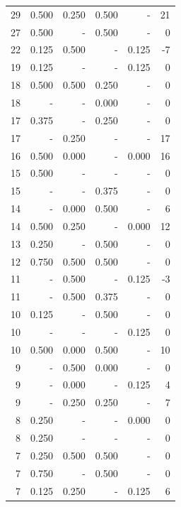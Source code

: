 \documentclass[a4paper]{article}\usepackage[]{graphicx}\usepackage[]{color}
\begin{document}
\begin{table}[ht]
\begin{tabular}{rrrrrr}
   \rowcolor{badColor} 29 & 0.500 & 0.250 & 0.500 & - & 21 \\ 
   \rowcolor{sosoColor} 27 & 0.500 & - & 0.500 & - & 0 \\ 
  22 & 0.125 & 0.500 & - & 0.125 & -7 \\ 
   \rowcolor{nullColor} 19 & 0.125 & - & - & 0.125 & 0 \\ 
   \rowcolor{badColor} 18 & 0.500 & 0.500 & 0.250 & - & 0 \\ 
   \rowcolor{sosoColor} 18 & - & - & 0.000 & - & 0 \\ 
   \rowcolor{sosoColor} 17 & 0.375 & - & 0.250 & - & 0 \\ 
  17 & - & 0.250 & - & - & 17 \\ 
  16 & 0.500 & 0.000 & - & 0.000 & 16 \\ 
   \rowcolor{nullColor} 15 & 0.500 & - & - & - & 0 \\ 
   \rowcolor{sosoColor} 15 & - & - & 0.375 & - & 0 \\ 
   \rowcolor{badColor} 14 & - & 0.000 & 0.500 & - & 6 \\ 
  14 & 0.500 & 0.250 & - & 0.000 & 12 \\ 
   \rowcolor{sosoColor} 13 & 0.250 & - & 0.500 & - & 0 \\ 
   \rowcolor{goodColor} 12 & 0.750 & 0.500 & 0.500 & - & 0 \\ 
  11 & - & 0.500 & - & 0.125 & -3 \\ 
  11 & - & 0.500 & 0.375 & - & 0 \\ 
   \rowcolor{sosoColor} 10 & 0.125 & - & 0.500 & - & 0 \\ 
   \rowcolor{nullColor} 10 & - & - & - & 0.125 & 0 \\ 
   \rowcolor{badColor} 10 & 0.500 & 0.000 & 0.500 & - & 10 \\ 
   \rowcolor{badColor} 9 & - & 0.500 & 0.000 & - & 0 \\ 
  9 & - & 0.000 & - & 0.125 & 4 \\ 
   \rowcolor{goodColor} 9 & - & 0.250 & 0.250 & - & 7 \\ 
   \rowcolor{nullColor} 8 & 0.250 & - & - & 0.000 & 0 \\ 
   \rowcolor{nullColor} 8 & 0.250 & - & - & - & 0 \\ 
   \rowcolor{goodColor} 7 & 0.250 & 0.500 & 0.500 & - & 0 \\ 
   \rowcolor{sosoColor} 7 & 0.750 & - & 0.500 & - & 0 \\ 
  7 & 0.125 & 0.250 & - & 0.125 & 6 \\ 

\end{tabular}
\end{table}
\end{document}
